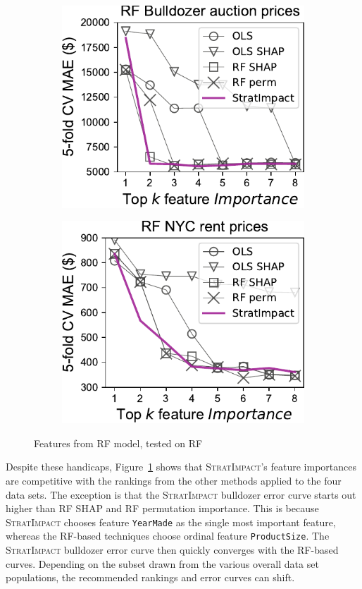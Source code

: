 \documentclass[11pt]{article}
\newcommand{\figref}[1]{Figure~\ref{#1}}
\newcommand{\todo}[1]{{{\color{red}{[#1]}}}}
\newcommand{\simp}{\fontfamily{cmr}\textsc{\small StratImpact}}
\begin{document}
\begin{figure}
\begin{subfigure}{.245\textwidth}
    \centering
\includegraphics[scale=0.45]{images/bulldozer-topk-RF-Importance.pdf}
\end{subfigure}%
\hfill
\begin{subfigure}{.245\textwidth}
    \centering
\includegraphics[scale=0.45]{images/rent-topk-RF-Importance.pdf}
\end{subfigure}
\caption[short]{Features from RF model, tested on RF}
\label{fig:topk}
\end{figure}

Despite these handicaps, \figref{fig:topk} shows that \simp{}'s feature importances are competitive with the rankings from the other methods  applied to the four data sets.   The exception is that the \simp{} bulldozer error curve starts out higher than RF SHAP and RF permutation importance. This is because \simp{} chooses feature {\tt YearMade} as the single most important feature, whereas the RF-based techniques choose ordinal feature {\tt ProductSize}. \todo{tie into importance graphs} The \simp{} bulldozer error curve then quickly converges with the RF-based curves.  Depending on the subset drawn from the various overall data set populations, the recommended rankings and error curves can shift.
\end{document}
